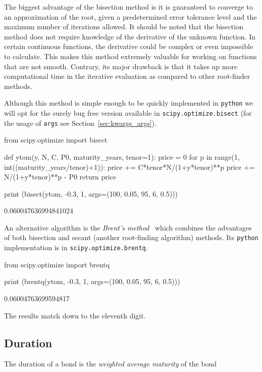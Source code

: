 The biggest advantage of the bisection method is it is guaranteed to converge to an approximation of the root, given a predetermined error tolerance level and the maximum number of iterations allowed. It should be noted that the bisection method does not require knowledge of the derivative of the unknown function. In certain continuous functions, the derivative could be complex or even impossible to calculate. This makes this method extremely valuable for working on functions that are not smooth.
Contrary, its major drawback is that it takes up more computational time in the iterative evaluation as compared to other root-finder methods. 

Although this method is simple enough to be quickly implemented in \texttt{python} we will opt for the surely bug free version available in \texttt{scipy.optimize.bisect} (for the usage of \texttt{args} see Section~\ref{sec:kwargs_args}).

\begin{ipython}
from scipy.optimize import bisect 

def ytom(y, N, C, P0, maturity_years, tenor=1): 
	price = 0
	for p in range(1, int((maturity_years/tenor)+1)):
		price += C*tenor*N/(1+y*tenor)**p
	price += N/(1+y*tenor)**p - P0 
	return price

print (bisect(ytom, -0.3, 1, args=(100, 0.05, 95, 6, 0.5)))
\end{ipython}
\begin{ioutput}
0.060047636994841024
\end{ioutput}

An alternative algorithm is the \emph{Brent's method}~\cite{bib:brent} which combines the advantages of both bisection and secant (another root-finding algorithm) methods. Its \texttt{python} implementation is in \texttt{scipy.optimize.brentq}.

\begin{ipython}
from scipy.optimize import brentq
    
print (brentq(ytom, -0.3, 1, args=(100, 0.05, 95, 6, 0.5)))
\end{ipython}
\begin{ioutput}
0.06004763699594817
\end{ioutput}

\noindent
The results match down to the eleventh digit.

\subsection{Duration}
The duration of a bond is the \emph{weighted average maturity} of the bond

